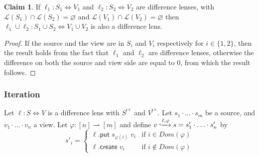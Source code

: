 \documentclass[acmsmall,review,anonymous]{acmart}\settopmatter{printfolios=true,printccs=false,printacmref=false}
\theoremstyle{definition}
\newtheorem{claim}{Claim}
\newcommand{\kw}[1]{\ensuremath{\mathsf{#1}}\xspace}
\newcommand{\pput}{\ensuremath{\kw{put}}\xspace}
\newcommand{\create}{\ensuremath{\kw{create}}\xspace}
\begin{document}
\begin{claim}
If $\ell_1 : S_1 \Leftrightarrow V_1$ and $\ell_2 : S_2 \Leftrightarrow V_2$ are difference lenses, with $\mathcal{L}(S_1) \cap \mathcal{L}(S_2) = \varnothing$ and $\mathcal{L}(V_1) \cap \mathcal{L}(V_2) = \varnothing$ then $\ell_1 \cup \ell_2 :
S_1 \cup S_2 \Leftrightarrow V_1 \cup V_2$ is also a difference lens.
\end{claim}
\begin{proof}
If the source and the view are in $S_i$ and $V_i$ respectively for $i \in \{1,2\}$, then the result holds from the fact that $\ell_1$ and $\ell_2$ are difference lenses, otherwise the difference on both the source and view side are equal to 0, from which the result follows.
\end{proof}
\subsubsection{Iteration}
Let $\ell : S \Leftrightarrow V$ is a difference lens with $S^{!*}$ and $V^{!*}$. Let $s_1 \cdot \ldots \cdot s_m$ be a source, and $v_1 \cdot \ldots \cdot v_n$ a view. Let $\varphi : [n] \rightharpoonup [m]$ and define $ v \xhookrightarrow{\ell, \varphi} s = s'_1 \cdot \ldots \cdot s'_n$ by 
$$s'_i = \begin{cases}
\ell.\pput \; s_{\varphi(i)} \; v_i & \text{if } i \in Dom(\varphi)\\
\ell.\create \; v_i & \text{if } i \not \in Dom(\varphi)
\end{cases}$$
\end{document}
